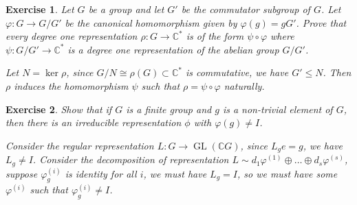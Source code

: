 \documentclass[11pt]{report}
\theoremstyle{mythm}
\let\oldendproof\endproof
\renewenvironment{proof}[1][\proofname]{%
  \oldproof[\normalfont \bfseries #1]%
}{\oldendproof}
\newtheorem{exercise}{Exercise}[chapter]
\renewcommand*{\proofname}{Proof}
\theoremstyle{myans}
\newcommand{\bbC}{\mathbb C}
\DeclareMathOperator{\GL}{GL}
\begin{document}
\setcounter{exercise}{12}
\begin{exercise}
  Let $G$ be a group and let $G'$ be the commutator subgroup of $G$. Let $\varphi: G \to G/G'$ be the
  canonical homomorphism given by $\varphi(g) = gG'$. Prove
  that every degree one representation $\rho\colon G \to \bbC^*$ is of the form $\psi \circ \varphi$ where
  $\psi\colon G/G' \to \bbC^*$ is a degree one representation of the abelian group $G/G'$.
  \begin{proof}
    Let $N = \ker \rho$, since $G/N \cong \rho(G) \subset \bbC^*$ is commutative, we have
    $G' \leq N$. Then $\rho$ induces the homomorphism $\psi$ such that $\rho = \psi \circ \varphi$
    naturally.
  \end{proof}
\end{exercise}

\begin{exercise}
  Show that if $G$ is a finite group and $g$ is a non-trivial element
  of $G$, then there is an irreducible representation $ϕ$ with $\varphi(g) \neq I$.
  \begin{proof}
    Consider the regular representation $L\colon G \to \GL(\bbC G)$, since $L_g e = g$,
    we have $L_g \neq I$. Consider the decomposition of representation
    $L \sim d_1\varphi^{(1)} \oplus \dots \oplus d_s\varphi^{(s)}$, suppose $\varphi^{(i)}_g$
    is identity for all $i$, we must have $L_g= I$, so we must have some $\varphi^{(i)}$
    such that $\varphi^{(i)}_g \neq I$.
  \end{proof}
\end{exercise}
\end{document}
